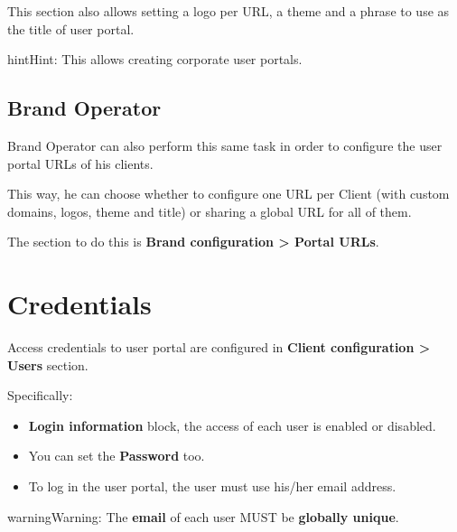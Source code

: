 \documentclass[letterpaper,10pt,english]{sphinxmanual}
\begin{document}
This section also allows setting a logo per URL, a theme and a phrase to use as
the title of user portal.

\begin{notice}{hint}{Hint:}
This allows creating corporate user portals.
\end{notice}


\subsection{Brand Operator}
\label{user_portal/urls:brand-operator}
Brand Operator can also perform this same task in order to configure the user
portal URLs of his clients.

This way, he can choose whether to configure one URL per Client (with custom
domains, logos, theme and title) or sharing a global URL for all of them.

The section to do this is \textbf{Brand configuration \textgreater{} Portal URLs}.


\section{Credentials}
\label{user_portal/credentials:credentials}\label{user_portal/credentials::doc}
Access credentials to user portal are configured in \textbf{Client configuration \textgreater{}
Users} section.

Specifically:
\begin{itemize}
\item {} 
\textbf{Login information} block, the access of each user is enabled or disabled.

\item {} 
You can set the \textbf{Password} too.

\item {} 
To log in the user portal, the user must use his/her email address.

\end{itemize}

\begin{notice}{warning}{Warning:}
The \textbf{email} of each user MUST be \textbf{globally unique}.
\end{notice}
\end{document}
